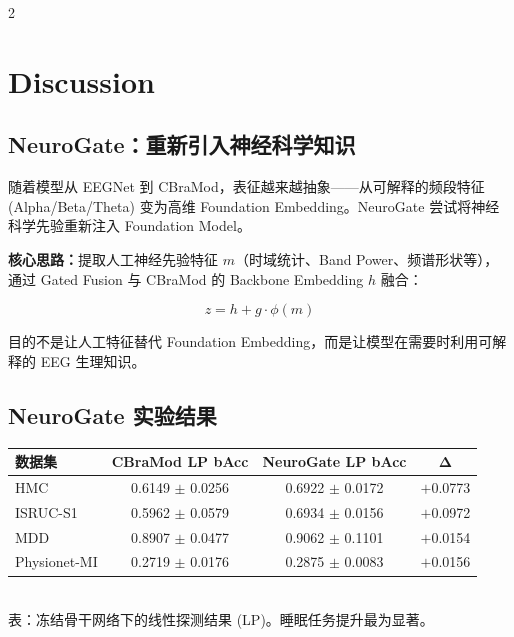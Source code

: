 \documentclass[12pt, a0paper]{article}
\renewcommand{\small}{\fontsize{18}{24}\selectfont}
\renewcommand{\footnotesize}{\fontsize{15}{20}\selectfont}
\begin{document}
\begin{multicols}{2}
\section{Discussion}

\subsection{NeuroGate：重新引入神经科学知识}

随着模型从 EEGNet 到 CBraMod，表征越来越抽象——从可解释的频段特征 (Alpha/Beta/Theta) 变为高维 Foundation Embedding。NeuroGate 尝试将神经科学先验重新注入 Foundation Model。

\textbf{核心思路：}提取人工神经先验特征 $m$（时域统计、Band Power、频谱形状等），通过 Gated Fusion 与 CBraMod 的 Backbone Embedding $h$ 融合：

\[
z = h + g \cdot \phi(m)
\]

目的不是让人工特征替代 Foundation Embedding，而是让模型在需要时利用可解释的 EEG 生理知识。

\subsection{NeuroGate 实验结果}

{\footnotesize
\begin{center}
\begin{tabular}{lccc}
\toprule
\textbf{数据集} & \textbf{CBraMod LP bAcc} & \textbf{NeuroGate LP bAcc} & \(\mathbf{\Delta}\) \\
\midrule
HMC & 0.6149 \(\pm\) 0.0256 & 0.6922 \(\pm\) 0.0172 & \cellcolor{mygreen!15}\(+\)0.0773 \\
ISRUC-S1 & 0.5962 \(\pm\) 0.0579 & 0.6934 \(\pm\) 0.0156 & \cellcolor{mygreen!15}\(+\)0.0972 \\
MDD & 0.8907 \(\pm\) 0.0477 & 0.9062 \(\pm\) 0.1101 & \(+\)0.0154 \\
Physionet-MI & 0.2719 \(\pm\) 0.0176 & 0.2875 \(\pm\) 0.0083 & \(+\)0.0156 \\
\bottomrule
\end{tabular}
\\[4pt]
{\small\color{mygray}表：冻结骨干网络下的线性探测结果 (LP)。睡眠任务提升最为显著。}
\end{center}
}


\end{multicols}
\end{document}

